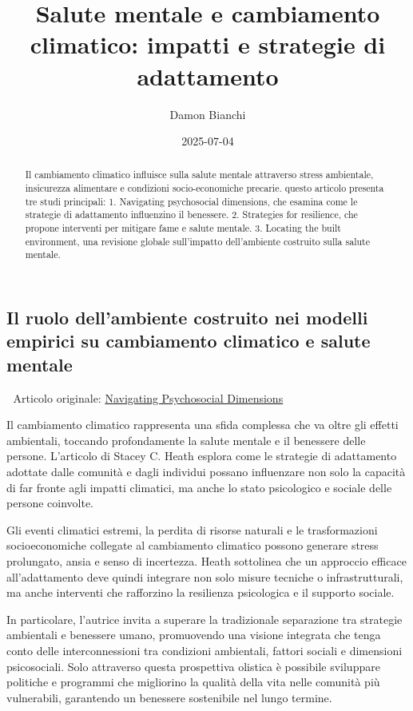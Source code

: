 \documentclass[
  italian,
]{article}
\title{Salute mentale e cambiamento climatico: impatti e strategie di
adattamento}
\author{Damon Bianchi}
\date{2025-07-04}
\begin{document}
\maketitle
\begin{abstract}
Il cambiamento climatico influisce sulla salute mentale attraverso
stress ambientale, insicurezza alimentare e condizioni socio-economiche
precarie. questo articolo presenta tre studi principali: 1. Navigating
psychosocial dimensions, che esamina come le strategie di adattamento
influenzino il benessere. 2. Strategies for resilience, che propone
interventi per mitigare fame e salute mentale. 3. Locating the built
environment, una revisione globale sull'impatto dell'ambiente costruito
sulla salute mentale.
\end{abstract}

\subsection{Il ruolo dell'ambiente costruito nei modelli empirici su
cambiamento climatico e salute
mentale}\label{il-ruolo-dellambiente-costruito-nei-modelli-empirici-su-cambiamento-climatico-e-salute-mentale}

📄 Articolo originale:
\href{https://www.sciencedirect.com/science/article/pii/S1877343524000800}{Navigating
Psychosocial Dimensions}

Il cambiamento climatico rappresenta una sfida complessa che va oltre
gli effetti ambientali, toccando profondamente la salute mentale e il
benessere delle persone. L'articolo di Stacey C. Heath esplora come le
strategie di adattamento adottate dalle comunità e dagli individui
possano influenzare non solo la capacità di far fronte agli impatti
climatici, ma anche lo stato psicologico e sociale delle persone
coinvolte.

Gli eventi climatici estremi, la perdita di risorse naturali e le
trasformazioni socioeconomiche collegate al cambiamento climatico
possono generare stress prolungato, ansia e senso di incertezza. Heath
sottolinea che un approccio efficace all'adattamento deve quindi
integrare non solo misure tecniche o infrastrutturali, ma anche
interventi che rafforzino la resilienza psicologica e il supporto
sociale.

In particolare, l'autrice invita a superare la tradizionale separazione
tra strategie ambientali e benessere umano, promuovendo una visione
integrata che tenga conto delle interconnessioni tra condizioni
ambientali, fattori sociali e dimensioni psicosociali. Solo attraverso
questa prospettiva olistica è possibile sviluppare politiche e programmi
che migliorino la qualità della vita nelle comunità più vulnerabili,
garantendo un benessere sostenibile nel lungo termine.
\end{document}
